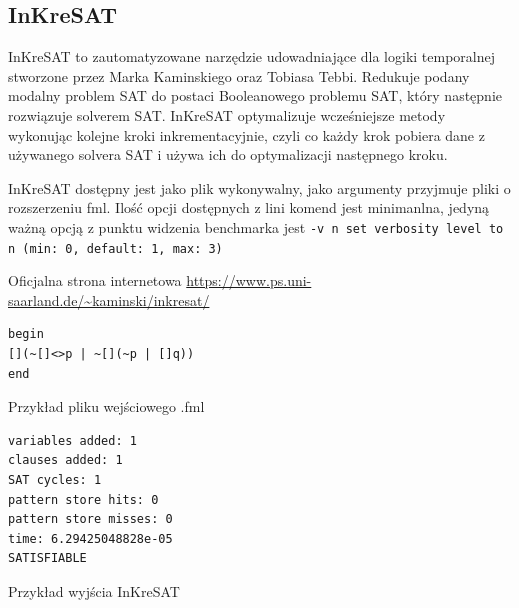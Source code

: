 \documentclass[a4paper,12pt]{article}
\newenvironment{longlisting}{\captionsetup{type=listing}}{}
\begin{document}
\begin{itemize}
\newpage
\subsection{InKreSAT}

InKreSAT to zautomatyzowane narzędzie udowadniające dla logiki temporalnej stworzone przez Marka Kaminskiego oraz Tobiasa Tebbi. Redukuje podany modalny problem SAT do postaci Booleanowego problemu SAT, który następnie rozwiązuje solverem SAT. InKreSAT optymalizuje wcześniejsze metody wykonując kolejne kroki inkrementacyjnie, czyli co każdy krok pobiera dane z używanego solvera SAT i używa ich do optymalizacji następnego kroku.

InKreSAT dostępny jest jako plik wykonywalny, jako argumenty przyjmuje pliki o rozszerzeniu fml. Ilość opcji dostępnych z lini komend jest minimanlna, jedyną ważną opcją z punktu widzenia benchmarka jest \texttt{-v n  set verbosity level to n (min: 0, default: 1, max: 3)}

\noindent
Oficjalna strona internetowa \url{https://www.ps.uni-saarland.de/~kaminski/inkresat/}



%

\begin{longlisting}
  \begin{verbatim}
begin
[](~[]<>p | ~[](~p | []q))
end
  \end{verbatim}
   \caption{Przykład pliku wejściowego .fml}
\end{longlisting}

\begin{longlisting}

  \begin{verbatim}
variables added: 1
clauses added: 1
SAT cycles: 1
pattern store hits: 0
pattern store misses: 0
time: 6.29425048828e-05
SATISFIABLE
  \end{verbatim}
   \caption{Przykład wyjścia InKreSAT}
\end{longlisting}


\end{itemize}
\end{document}
